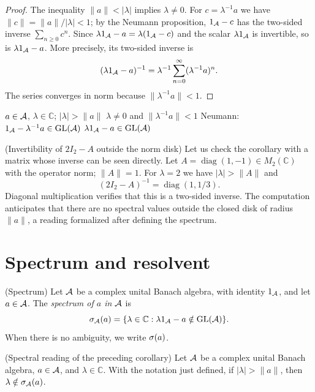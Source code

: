 \begin{proof}[Proof]
The inequality $\|a\|<|\lambda|$ implies $\lambda\ne0$. For
$c=\lambda^{-1}a$ we have $\|c\|=\|a\|/|\lambda|<1$;
by the Neumann proposition, $1_\mathcal A-c$ has the two-sided inverse
$\sum_{n\ge0}c^n$. Since
$\lambda1_\mathcal A-a=\lambda(1_\mathcal A-c)$ and the scalar
$\lambda1_\mathcal A$ is invertible, so is $\lambda1_\mathcal A-a$.
More precisely, its two-sided inverse is
\[
 (\lambda1_\mathcal A-a)^{-1}
 =\lambda^{-1}\sum_{n=0}^{\infty}(\lambda^{-1}a)^n.
\]
The series converges in norm because $\|\lambda^{-1}a\|<1$.
\end{proof}

\proofdiagram
{$a\in\mathcal A$, $\lambda\in\mathbb C$; $|\lambda|>\|a\|$}
{$\lambda\ne0$ and $\|\lambda^{-1}a\|<1$}
{Neumann: $1_\mathcal A-\lambda^{-1}a\in\operatorname{GL}(\mathcal A)$}
{$\lambda1_\mathcal A-a\in\operatorname{GL}(\mathcal A)$}

\begin{cthejemplo}{(Invertibility of $2I_2-A$ outside the norm disk)}
Let us check the corollary with a matrix whose inverse can be seen
directly. Let
$A=\operatorname{diag}(1,-1)\in M_2(\mathbb C)$ with the operator norm;
$\|A\|=1$. For $\lambda=2$ we have $|\lambda|>\|A\|$ and
\[
  (2I_2-A)^{-1}=\operatorname{diag}(1,1/3).
\]
Diagonal multiplication verifies that this is a two-sided inverse.
The computation anticipates that there are no spectral values outside
the closed disk of radius $\|a\|$, a reading formalized after defining the spectrum.
\end{cthejemplo}

\section{Spectrum and resolvent}

\begin{cthdefinicion}{(Spectrum)}
Let $\mathcal A$ be a complex unital Banach algebra, with identity $1_\mathcal A$,
and let $a\in\mathcal A$. The \emph{spectrum of $a$ in $\mathcal A$} is
\[
 \sigma_\mathcal A(a)=\{\lambda\in\mathbb C:\lambda1_\mathcal A-a\notin\operatorname{GL}(\mathcal A)\}.
\]
When there is no ambiguity, we write $\sigma(a)$.
\end{cthdefinicion}

\begin{cthobservacion}{(Spectral reading of the preceding corollary)}
Let $\mathcal A$ be a complex unital Banach algebra, $a\in\mathcal A$, and
$\lambda\in\mathbb C$. With the notation just defined, if
$|\lambda|>\|a\|$, then $\lambda\notin\sigma_\mathcal A(a)$.
\end{cthobservacion}


